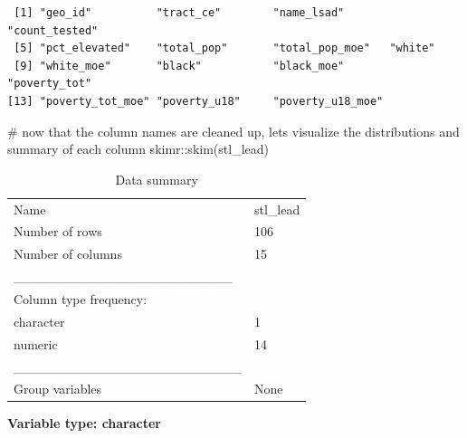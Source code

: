 \documentclass[
  letterpaper,
  DIV=11,
  numbers=noendperiod]{scrartcl}
\newenvironment{Shaded}{\begin{snugshade}}{\end{snugshade}}
\newcommand{\CommentTok}[1]{\textcolor[rgb]{0.37,0.37,0.37}{#1}}
\newcommand{\FunctionTok}[1]{\textcolor[rgb]{0.28,0.35,0.67}{#1}}
\newcommand{\NormalTok}[1]{\textcolor[rgb]{0.00,0.23,0.31}{#1}}
\newcommand{\SpecialCharTok}[1]{\textcolor[rgb]{0.37,0.37,0.37}{#1}}
\begin{document}
\begin{verbatim}
 [1] "geo_id"          "tract_ce"        "name_lsad"       "count_tested"   
 [5] "pct_elevated"    "total_pop"       "total_pop_moe"   "white"          
 [9] "white_moe"       "black"           "black_moe"       "poverty_tot"    
[13] "poverty_tot_moe" "poverty_u18"     "poverty_u18_moe"
\end{verbatim}

\begin{Shaded}
\begin{Highlighting}[]
\CommentTok{\# now that the column names are cleaned up, let\textquotesingle{}s visualize the distributions and summary of each column }
\NormalTok{skimr}\SpecialCharTok{::}\FunctionTok{skim}\NormalTok{(stl\_lead)}
\end{Highlighting}
\end{Shaded}

\begin{longtable}[]{@{}ll@{}}
\caption{Data summary}\tabularnewline
\toprule\noalign{}
\endfirsthead
\endhead
\bottomrule\noalign{}
\endlastfoot
Name & stl\_lead \\
Number of rows & 106 \\
Number of columns & 15 \\
\_\_\_\_\_\_\_\_\_\_\_\_\_\_\_\_\_\_\_\_\_\_\_ & \\
Column type frequency: & \\
character & 1 \\
numeric & 14 \\
\_\_\_\_\_\_\_\_\_\_\_\_\_\_\_\_\_\_\_\_\_\_\_\_ & \\
Group variables & None \\
\end{longtable}

\textbf{Variable type: character}
\end{document}
